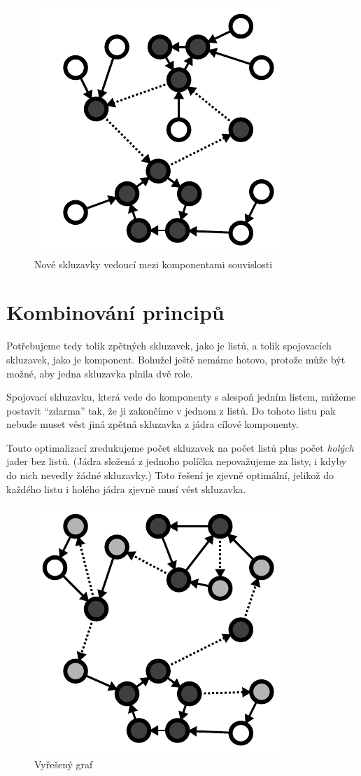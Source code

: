 \documentclass{article}
\begin{document}
\begin{figure}[ht]
    \centering
    \includegraphics{cross-edge.pdf}
    \caption{Nové skluzavky vedoucí mezi komponentami souvislosti}
\end{figure}

\section{Kombinování principů}

Potřebujeme tedy tolik zpětných skluzavek, jako je listů, a tolik spojovacích skluzavek, jako je komponent. Bohužel ještě nemáme hotovo, protože může být možné, aby jedna skluzavka plnila dvě role.

Spojovací skluzavku, která vede do komponenty s alespoň jedním listem, můžeme postavit \enquote{zdarma} tak, že ji zakončíme v jednom z listů. Do tohoto listu pak nebude muset vést jiná zpětná skluzavka z jádra cílové komponenty.

Touto optimalizací zredukujeme počet skluzavek na počet listů plus počet \textit{holých} jader bez listů. (Jádra složená z jednoho políčka nepovažujeme za listy, i kdyby do nich nevedly žádné skluzavky.) Toto řešení je zjevně optimální, jelikož do každého listu i holého jádra zjevně musí vést skluzavka.

\begin{figure}[ht]
    \centering
    \includegraphics{all-edges.pdf}
    \caption{Vyřešený graf}
\end{figure}
\end{document}
